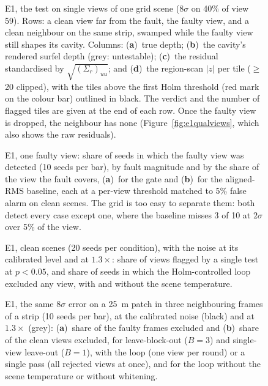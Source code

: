 \begin{figure}[!t]
\centering

\caption{E1, the test on single views of one grid scene ($8\sigma$ on 40\% of view 59). Rows: a clean view far
from the fault, the faulty view, and a clean neighbour on the same strip, swamped while the faulty view
still shapes its cavity. Columns: (\textbf{a})~true depth; (\textbf{b})~the cavity's rendered surfel depth (grey: untestable);
(\textbf{c})~the residual standardised by $\sqrt{(\Sigma_r)_{uu}}$; and (\textbf{d})~the region-scan $|z|$ per
tile ($\geq$20 clipped), with the tiles above the first Holm threshold (red mark on the colour bar) outlined
in black. The verdict and the number of flagged tiles are given at the end of each row. Once the faulty view
is dropped, the neighbour has none (Figure~\ref{fig:e1qualviews}, which also shows the raw residuals).}
\label{fig:e1compact}
\end{figure}

\begin{figure}[!t]
\centering

\caption{E1, one faulty view: share of seeds in which the faulty view was detected (10 seeds per bar), by
fault magnitude and by the share of the view the fault covers, (\textbf{a})~for the gate and
(\textbf{b})~for the aligned-RMS baseline, each at a per-view threshold matched to 5\% false alarm on clean
scenes. The grid is too easy to separate them: both detect every case except one, where the baseline
misses 3 of 10 at $2\sigma$ over 5\% of the view.}
\label{fig:e1grid}
\end{figure}

\begin{figure}[!t]
\centering

\caption{E1, clean scenes (20 seeds per condition), with the noise at its calibrated level and at
$1.3\times$: share of views flagged by a single test at $p<0.05$, and share of seeds in which the
Holm-controlled loop excluded any view, with and without the scene temperature.}
\label{fig:e1clean}
\end{figure}

\begin{figure}[!t]
\centering

\caption{E1, the same $8\sigma$ error on a 25~m patch in three neighbouring frames of a strip (10 seeds per
bar), at the calibrated noise (black) and at $1.3\times$ (grey): (\textbf{a})~share of the faulty frames
excluded and (\textbf{b})~share of the clean views excluded, for leave-block-out ($B=3$) and single-view
leave-out ($B=1$), with the loop (one view per round) or a single pass (all rejected views at once), and
for the loop without the scene temperature or without whitening.}
\label{fig:e1repeated}
\end{figure}

